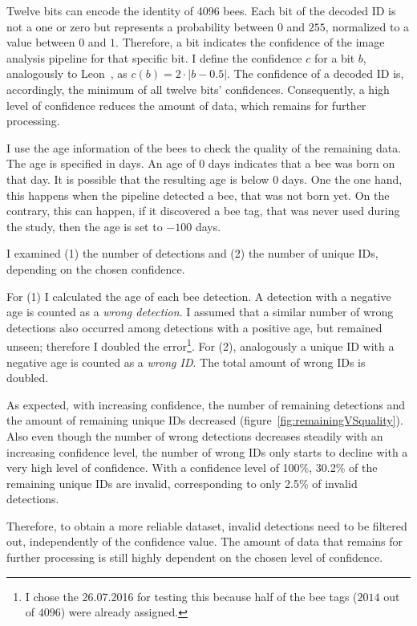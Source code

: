 
Twelve bits can encode the identity of 4096 bees.
Each bit of the decoded ID is not a one or zero but represents a probability between $0$ and $255$, normalized to a value between $0$ and $1$.
Therefore, a bit indicates the confidence of the image analysis pipeline for that specific bit.
I define the confidence $c$ for a bit $b$, analogously to Leon~\textcite[p.~14]{leon2016}, as $c(b)=2\cdot|b-0.5|$.
The confidence of a decoded ID is, accordingly, the minimum of all twelve bits' confidences.
Consequently, a high level of confidence reduces the amount of data, which remains for further processing.

I use the age information of the bees to check the quality of the remaining data.
The age is specified in days.
An age of $0$ days indicates that a bee was born on that day.
It is possible that the resulting age is below $0$ days.
One the one hand, this happens when the pipeline detected a bee, that was not born yet.
On the contrary, this can happen, if it discovered a bee tag, that was never used during the study, then the age is set to $-100$ days.

I examined (1) the number of detections and (2) the number of unique IDs, depending on the chosen confidence.

For (1) I calculated the age of each bee detection.
A detection with a negative age is counted as a \emph{wrong detection}.
I assumed that a similar number of wrong detections also occurred among detections with a positive age, but remained unseen; therefore I doubled the error\footnote{I chose the 26.07.2016 for testing this because half of the bee tags ($2014$ out of $4096$) were already assigned.}.
For (2), analogously a unique ID with a negative age is counted as a \emph{wrong ID}. The total amount of wrong IDs is doubled.

As expected, with increasing confidence, the number of remaining detections and the amount of remaining unique IDs decreased (figure~\ref{fig:remainingVSquality}).
Also even though the number of wrong detections decreases steadily with an increasing confidence level, the number of wrong IDs only starts to decline with a very high level of confidence.
With a confidence level of 100\%, 30.2\% of the remaining unique IDs are invalid, corresponding to only 2.5\% of invalid detections.

Therefore, to obtain a more reliable dataset, invalid detections need to be filtered out, independently of the confidence value.
The amount of data that remains for further processing is still highly dependent on the chosen level of confidence.

